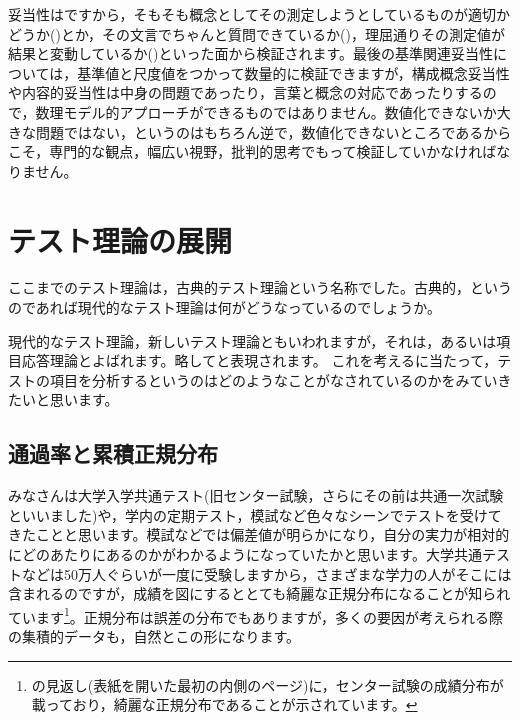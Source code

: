 \documentclass{ltjsbook}
\begin{document}
妥当性はですから，そもそも概念としてその測定しようとしているものが適切かどうか()とか，その文言でちゃんと質問できているか()，理屈通りその測定値が結果と変動しているか()といった面から検証されます。最後の基準関連妥当性については，基準値と尺度値をつかって数量的に検証できますが，構成概念妥当性や内容的妥当性は中身の問題であったり，言葉と概念の対応であったりするので，数理モデル的アプローチができるものではありません。数値化できないか大きな問題ではない，というのはもちろん逆で，数値化できないところであるからこそ，専門的な観点，幅広い視野，批判的思考でもって検証していかなければなりません。


\section{テスト理論の展開}
\label{NewTestTheory}
ここまでのテスト理論は，古典的テスト理論という名称でした。古典的，というのであれば現代的なテスト理論は何がどうなっているのでしょうか。

現代的なテスト理論，新しいテスト理論ともいわれますが，それは，あるいは項目応答理論とよばれます。略してと表現されます。
これを考えるに当たって，テストの項目を分析するというのはどのようなことがなされているのかをみていきたいと思います。

\subsection{通過率と累積正規分布}
みなさんは大学入学共通テスト(旧センター試験，さらにその前は共通一次試験といいました)や，学内の定期テスト，模試など色々なシーンでテストを受けてきたことと思います。模試などでは偏差値が明らかになり，自分の実力が相対的にどのあたりにあるのかがわかるようになっていたかと思います。大学共通テストなどは50万人ぐらいが一度に受験しますから，さまざまな学力の人がそこには含まれるのですが，成績を図にするととても綺麗な正規分布になることが知られています\footnote{\citet{Yamauchi201001}の見返し(表紙を開いた最初の内側のページ)に，センター試験の成績分布が載っており，綺麗な正規分布であることが示されています。}。正規分布は誤差の分布でもありますが，多くの要因が考えられる際の集積的データも，自然とこの形になります。
\end{document}
